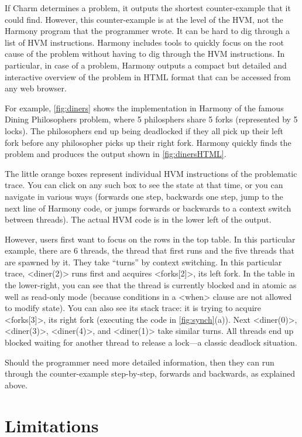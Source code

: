 \documentclass[twocolumn]{article}
\begin{document}
If Charm determines a problem, it outputs the shortest counter-example that
it could find.  However, this counter-example is at the level of the HVM,
not the Harmony program that the programmer wrote.  It can be hard to
dig through a list of HVM instructions.
Harmony includes tools to quickly focus on the root cause of the
problem without having to dig through the HVM instructions.
In particular, in case of a problem, Harmony outputs a compact
but detailed and interactive overview of the problem in HTML format that
can be accessed from any web browser.

For example, \autoref{fig:diners} shows the implementation
in Harmony of the famous Dining Philosophers problem, where 5 philosphers
share 5 forks (represented by 5 locks).
The philosophers end up being deadlocked
if they all pick up their left fork before any philosopher picks up
their right fork.
Harmony quickly finds the problem and produces the output
shown in \autoref{fig:dinersHTML}.

The little orange boxes represent individual HVM instructions of the
problematic trace.  You can click on any such box to see the state
at that time, or you can navigate in various ways (forwards one step,
backwards one step, jump to the next line of Harmony code, or jumps
forwards or backwards to a context switch between threads).  The actual
HVM code is in the lower left of the output.

However, users first want to focus on the rows in the top table.
In this particular example, there are 6 threads, the thread that
first runs and the five threads that are spawned by it.  They take
``turns'' by context switching.  In this particular trace, <{diner(2)}>
runs first and acquires <{forks[2]}>, its left fork.  In the table
in the lower-right, you can see that the thread is currently blocked
and in atomic as well as read-only mode (because conditions in a <{when}>
clause are not allowed to modify state).  You can also see its stack
trace: it is trying to acquire <{forks[3]}>, its right fork (executing
the code in \autoref{fig:synch}(a)).  Next <{diner(0)}>, <{diner(3)}>,
<{diner(4)}>, and <{diner(1)}> take similar turns.  All threads end up
blocked waiting for another thread to release a lock---a classic
deadlock situation.

Should the programmer need more detailed information, then they can
run through the counter-example step-by-step, forwards and backwards,
as explained above.

\section{Limitations}
\end{document}
